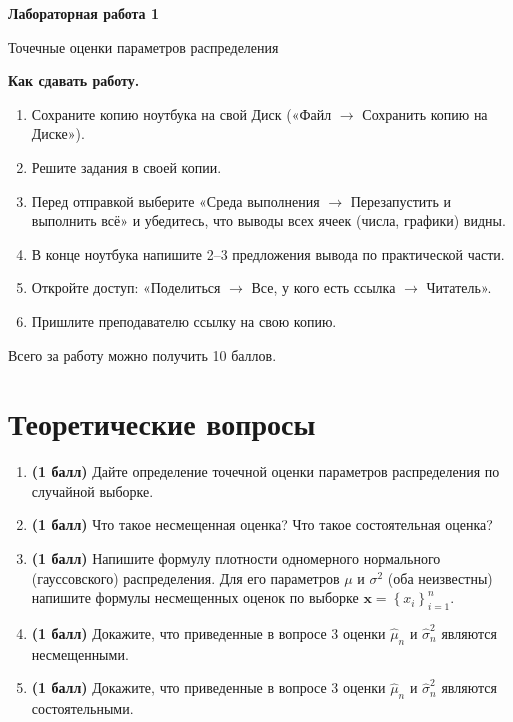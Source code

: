 \documentclass[a4paper,12pt]{article}
\newcommand{\pts}[1]{\textbf{(#1)}}
\begin{document}
\begin{center}
  {\Large\bfseries Лабораторная работа 1\par}
  {\large Точечные оценки параметров распределения\par}
\end{center}

\textbf{Как сдавать работу.}
\begin{enumerate}[itemsep=0.3em]
  \item Сохраните копию ноутбука на свой Диск («Файл $\to$ Сохранить копию на Диске»).
  \item Решите задания в своей копии.
  \item Перед отправкой выберите «Среда выполнения $\to$ Перезапустить и выполнить всё» и убедитесь, что выводы всех ячеек (числа, графики) видны.
  \item В конце ноутбука напишите 2--3 предложения вывода по практической части.
  \item Откройте доступ: «Поделиться $\to$ Все, у кого есть ссылка $\to$ Читатель».
  \item Пришлите преподавателю ссылку на свою копию.
\end{enumerate}

Всего за работу можно получить 10 баллов.

\section*{Теоретические вопросы}

\begin{enumerate}
  \item \pts{1 балл} Дайте определение точечной оценки параметров распределения по случайной выборке.

  \item \pts{1 балл} Что такое несмещенная оценка? Что такое состоятельная оценка?

  \item \pts{1 балл} Напишите формулу плотности одномерного нормального (гауссовского) распределения. Для его параметров $\mu$ и $\sigma^2$ (оба неизвестны) напишите формулы несмещенных оценок по выборке 
  $\mathbf{x}=\left\{x_i\right\}_{i=1}^n$.

  \item \pts{1 балл} Докажите, что приведенные в вопросе 3 оценки $\hat{\mu}_n$ и $\hat{\sigma}_n^2$ являются несмещенными.

  \item \pts{1 балл} Докажите, что приведенные в вопросе 3 оценки $\hat{\mu}_n$ и $\hat{\sigma}_n^2$ являются состоятельными.

\end{enumerate}
\end{document}
